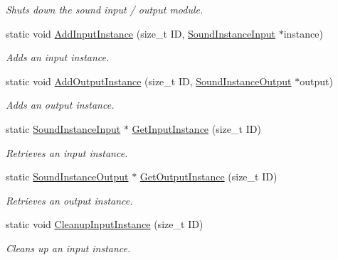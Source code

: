 \begin{DoxyCompactItemize}
\begin{DoxyCompactList}\small\item\em Shuts down the sound input / output module. \item\end{DoxyCompactList}\item 
static void \hyperlink{class_sound_utility_a6a9d5c1aa5d0f0f982ce3de3d76404da}{AddInputInstance} (size\_\-t ID, \hyperlink{class_sound_instance_input}{SoundInstanceInput} $\ast$instance)
\begin{DoxyCompactList}\small\item\em Adds an input instance. \item\end{DoxyCompactList}\item 
static void \hyperlink{class_sound_utility_ac12d97e77c28cbbd95df243965dc8c4d}{AddOutputInstance} (size\_\-t ID, \hyperlink{class_sound_instance_output}{SoundInstanceOutput} $\ast$output)
\begin{DoxyCompactList}\small\item\em Adds an output instance. \item\end{DoxyCompactList}\item 
static \hyperlink{class_sound_instance_input}{SoundInstanceInput} $\ast$ \hyperlink{class_sound_utility_a12dd33f6aaa1ac063c707c806aa39573}{GetInputInstance} (size\_\-t ID)
\begin{DoxyCompactList}\small\item\em Retrieves an input instance. \item\end{DoxyCompactList}\item 
static \hyperlink{class_sound_instance_output}{SoundInstanceOutput} $\ast$ \hyperlink{class_sound_utility_a9c7d16f70ad0eaa3bb5df014b55ea8e1}{GetOutputInstance} (size\_\-t ID)
\begin{DoxyCompactList}\small\item\em Retrieves an output instance. \item\end{DoxyCompactList}\item 
static void \hyperlink{class_sound_utility_a91bf5ab4d9ddfba89f75972db260ac7e}{CleanupInputInstance} (size\_\-t ID)
\begin{DoxyCompactList}\small\item\em Cleans up an input instance. \item\end{DoxyCompactList}\item 

\end{DoxyCompactItemize}
